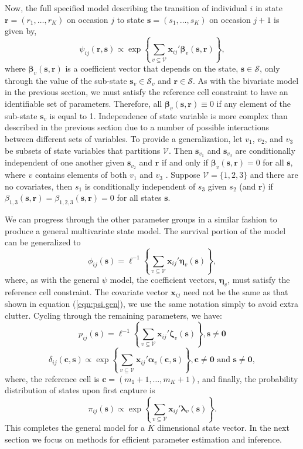 \documentclass[fleqn]{article}
\newcommand{\bs}{\ensuremath{\mathbf{s}}}
\newcommand{\bc}{\ensuremath{\mathbf{c}}}
\newcommand{\fS}{\ensuremath{\mathcal{S}}}
\newcommand{\br}{\ensuremath{\mathbf{r}}}
\newcommand{\fV}{\ensuremath{\mathcal{V}}}
\newcommand{\bx}{\ensuremath{\mathbf{x}}}
\newcommand{\bb}{\ensuremath{\boldsymbol{\beta}}}
\newcommand{\ba}{\ensuremath{\boldsymbol{\alpha}}}
\newcommand{\bl}{\ensuremath{\boldsymbol{\lambda}}}
\newcommand{\bn}{\ensuremath{\boldsymbol{\eta}}}
\newcommand{\bz}{\ensuremath{\boldsymbol{\zeta}}}
\newcommand{\bzero}{\ensuremath{\mathbf{0}}}
\begin{document}
Now, the full specified model describing the transition of individual $i$ in state $\br = (r_1,\dots,r_K)$ on occasion $j$ to state $\bs=(s_1,\dots,s_K)$ on occasion $j+1$ is given by,
\begin{equation}
\label{eqn:psi.gen}
\psi_{ij}(\br,\bs) \propto \exp\left\{ \sum_{v\subseteq\fV}\bx_{ij}'\bb_v(\bs,\br)\right\},
\end{equation}
where $\bb_v(\bs,\br)$ is a coefficient vector that depends on the state, $\bs\in\fS$, only through the value of the sub-state $\bs_v\in\fS_v$ and $\br\in\fS$. As with the bivariate model in the previous section, we must satisfy the reference cell constraint to have an identifiable set of parameters. Therefore, all $\bb_v(\bs,\br) \equiv 0$ if any element of the sub-state $\bs_v$ is equal to 1. Independence of state variable is more complex than described in the previous section due to a number of possible interactions between different sets of variables. To provide a generalization, let $v_1$, $v_2$, and $v_3$ be subsets of state variables that partitions $\fV$. Then $\bs_{v_1}$ and $\bs_{v_3}$ are conditionally independent of one another given $\bs_{v_2}$ and $\br$ if and only if $\bb_v(\bs,\br) = 0$ for all $\bs$, where $v$ contains elements of both $v_1$ and $v_3$ \citep{Johnson:2003bh}. Suppose $\fV=\{1,2,3\}$ and there are no covariates, then $s_1$ is conditionally independent of $s_3$ given $s_2$ (and $\br$) if $\beta_{1,3}(\bs,\br) = \beta_{1,2,3}(\bs,\br)=0$ for all states $\bs$. 

We can progress through the other parameter groups in a similar fashion to produce a general multivariate state model. The survival portion of the model can be generalized to 
\begin{equation}
\phi_{ij}(\bs) = \ell^{-1}\left\{ \sum_{v\subseteq\fV}\bx_{ij}'\bn_v(\bs)\right\},
\end{equation}
where, as with the general $\psi$ model, the coefficient vectors, $\bn_v$, must satisfy the reference cell constraint. The covariate vector $\bx_{ij}$ need not be the same as that shown in equation (\ref{eqn:psi.gen}), we use the same notation simply to avoid extra clutter. Cycling through the remaining parameters, we have:
\begin{equation}
p_{ij}(\bs) = \ell^{-1}\left\{ \sum_{v\subseteq\fV}\bx_{ij}'\bz_v(\bs)\right\}, \bs \ne \bzero
\end{equation}
\begin{equation}
\delta_{ij}(\bc,\bs) \propto \exp\left\{ \sum_{v\subseteq\fV}\bx_{ij}'\ba_v(\bc,\bs)\right\}, \bc \ne \bzero \mbox{ and } \bs \ne \bzero,
\end{equation}
where, the reference cell is $\bc=(m_1+1,\dots,m_K+1)$, and finally, the probability distribution of states upon first capture is
\begin{equation}
\pi_{ij}(\bs)\propto \exp\left\{ \sum_{v\subseteq\fV}\bx_{ij}'\bl_v(\bs)\right\}.
\end{equation}  
This completes the general model for a $K$ dimensional state vector. In the next section we focus on methods for efficient parameter estimation and inference. 
 
\end{document}
